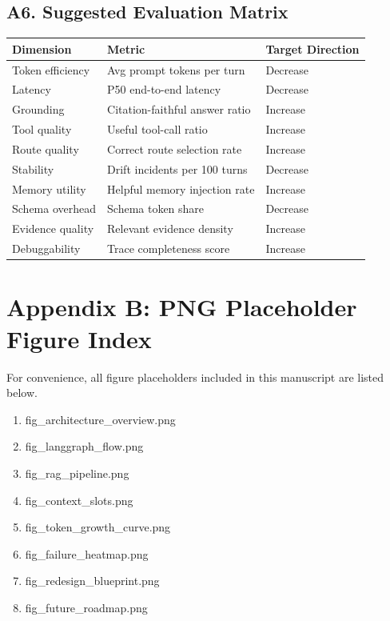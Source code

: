 \documentclass[conference]{IEEEtran}
\begin{document}
\subsection*{A6. Suggested Evaluation Matrix}

\begin{longtable}{p{2.0cm}p{2.4cm}p{2.6cm}}
\toprule
Dimension & Metric & Target Direction \\
\midrule
Token efficiency & Avg prompt tokens per turn & Decrease \\
Latency & P50 end-to-end latency & Decrease \\
Grounding & Citation-faithful answer ratio & Increase \\
Tool quality & Useful tool-call ratio & Increase \\
Route quality & Correct route selection rate & Increase \\
Stability & Drift incidents per 100 turns & Decrease \\
Memory utility & Helpful memory injection rate & Increase \\
Schema overhead & Schema token share & Decrease \\
Evidence quality & Relevant evidence density & Increase \\
Debuggability & Trace completeness score & Increase \\
\bottomrule
\end{longtable}

\section*{Appendix B: PNG Placeholder Figure Index}

For convenience,
all figure placeholders included in this manuscript are listed below.

\begin{enumerate}[leftmargin=1.2em]
\item fig\_architecture\_overview.png
\item fig\_langgraph\_flow.png
\item fig\_rag\_pipeline.png
\item fig\_context\_slots.png
\item fig\_token\_growth\_curve.png
\item fig\_failure\_heatmap.png
\item fig\_redesign\_blueprint.png
\item fig\_future\_roadmap.png
\end{enumerate}
\end{document}

